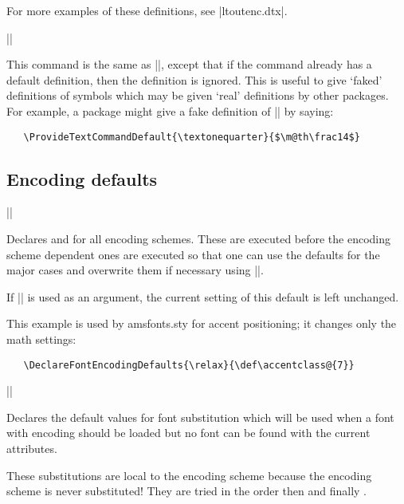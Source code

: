 \documentclass{ltxguide}[1995/11/28]
\begin{document}
For more examples of these definitions, see |ltoutenc.dtx|.

\newpage

\begin{decl}[1994/12/01]
  |\ProvideTextCommandDefault|  
\end{decl}
This command is the same as |\DeclareTextCommandDefault|, except that if
the command already has a default definition, then the definition is
ignored.  This is useful to give `faked' definitions of symbols which
may be given `real' definitions by other packages.  For example, a
package might give a fake definition of |\textonequarter| by saying:
\begin{verbatim}
   \ProvideTextCommandDefault{\textonequarter}{$\m@th\frac14$}
\end{verbatim}

\subsection{Encoding defaults} \label{sec:encoding-defaults}

\begin{decl}
  |\DeclareFontEncodingDefaults|  
\end{decl}

Declares  and  for all encoding
schemes.  These are executed before the encoding scheme dependent ones
are executed so that one can use the defaults for the major cases and
overwrite them if necessary using |\DeclareFontEncoding|.

If |\relax| is used as an argument, the current setting of this default
is left unchanged.

This example is used by amsfonts.sty for accent positioning; it changes
only the math settings:
\begin{verbatim}
   \DeclareFontEncodingDefaults{\relax}{\def\accentclass@{7}}
\end{verbatim}


\begin{decl}
  |\DeclareFontSubstitution|    
\end{decl}

Declares the default values for font substitution which will be used
when a font with encoding  should be loaded but no font can
be found with the current attributes.

These substitutions are local to the encoding scheme because the
encoding scheme is never substituted!  They are tried in the order
 then  and finally .
\end{document}
